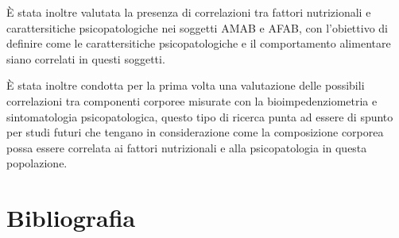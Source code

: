 \documentclass[12pt]{article}
\begin{document}
È stata inoltre valutata la presenza di correlazioni tra fattori nutrizionali e carattersitiche psicopatologiche nei soggetti AMAB e AFAB, con l'obiettivo di definire come le carattersitiche psicopatologiche e il comportamento alimentare siano correlati in questi soggetti.

È stata inoltre condotta per la prima volta una valutazione delle possibili correlazioni tra componenti corporee misurate con la bioimpedenziometria e sintomatologia psicopatologica, questo tipo di ricerca punta ad essere di spunto per studi futuri che tengano in considerazione come la composizione corporea possa essere correlata ai fattori nutrizionali e alla psicopatologia in questa popolazione.
\section{Bibliografia}
\label{sec:org9e8f7ce}
\end{document}
